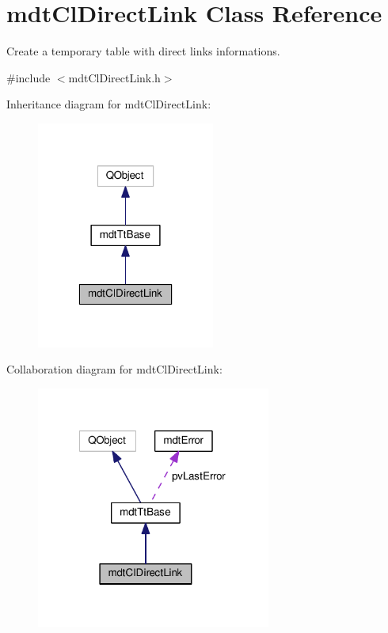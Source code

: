 \hypertarget{classmdt_cl_direct_link}{\section{mdt\-Cl\-Direct\-Link Class Reference}
\label{classmdt_cl_direct_link}
}


Create a temporary table with direct links informations.  




{\ttfamily \#include $<$mdt\-Cl\-Direct\-Link.\-h$>$}



Inheritance diagram for mdt\-Cl\-Direct\-Link\-:\nopagebreak
\begin{figure}[H]
\begin{center}
\leavevmode
\includegraphics[width=166pt]{classmdt_cl_direct_link__inherit__graph}
\end{center}
\end{figure}


Collaboration diagram for mdt\-Cl\-Direct\-Link\-:\nopagebreak
\begin{figure}[H]
\begin{center}
\leavevmode
\includegraphics[width=218pt]{classmdt_cl_direct_link__coll__graph}
\end{center}
\end{figure}
